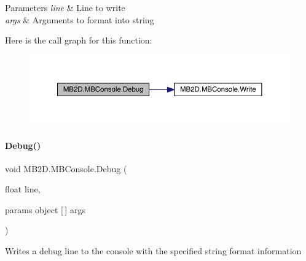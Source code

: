 \begin{DoxyParams}{Parameters}
{\em line} & Line to write\\
\hline
{\em args} & Arguments to format into string\\
\hline
\end{DoxyParams}
Here is the call graph for this function\+:
\nopagebreak
\begin{figure}[H]
\begin{center}
\leavevmode
\includegraphics[width=350pt]{class_m_b2_d_1_1_m_b_console_aef53935b8ae3c6cd2b87a81e5dbcdf1e_cgraph}
\end{center}
\end{figure}
\hypertarget{class_m_b2_d_1_1_m_b_console_a918307d1a003684b1fa3e0d11243b1f9}{}\label{class_m_b2_d_1_1_m_b_console_a918307d1a003684b1fa3e0d11243b1f9} 
\paragraph{\texorpdfstring{Debug()}{Debug()}\hspace{0.1cm}{\footnotesize\ttfamily [4/4]}}
{\footnotesize\ttfamily void M\+B2\+D.\+M\+B\+Console.\+Debug (\begin{DoxyParamCaption}\item[{float}]{line,  }\item[{params object \mbox{[}$\,$\mbox{]}}]{args }\end{DoxyParamCaption})\hspace{0.3cm}{\ttfamily [inline]}}



Writes a debug line to the console with the specified string format information 


